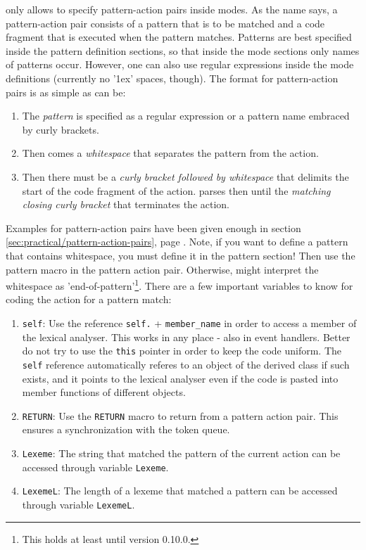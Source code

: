 {\Quex} only allows to specify pattern-action pairs inside modes. As the name
says, a pattern-action pair consists of a pattern that is to be matched and a
code fragment that is executed when the pattern matches. Patterns are best
specified inside the pattern definition sections, so that inside the mode sections
only names of patterns occur. However, one can also use regular expressions
inside the mode definitions (currently no '\kern 1ex' spaces, though). The format for pattern-action pairs is as simple
as can be: 

\begin{enumerate}
\item The {\it pattern} is specified as a regular expression or a pattern name
embraced by curly brackets.
\item Then comes a {\it whitespace} that separates the pattern from the action.
\item Then there must be a {\it curly bracket followed by whitespace} that
  delimits the start of the code fragment of the action. {\Quex} parses then
  until the {\it matching closing curly bracket} that terminates the action.
\end{enumerate}

Examples for pattern-action pairs have been given enough in section
\ref{sec:practical/pattern-action-pairs}, page
\pageref{sec:practical/pattern-action-pairs}. Note, if you want to define a
pattern that contains whitespace, you must define it in the pattern section!
Then use the pattern macro in the pattern action pair.  Otherwise, {\quex}
might interpret the whitespace as 'end-of-pattern'\footnote{This holds at least
  until version 0.10.0.}. There are a few important variables to know for
coding the action for a pattern match:

\begin{enumerate}
\item {\tt self}: Use the reference {\tt self.} + {\tt member\_name} in order to access a member of
  the lexical analyser. This works in any place - also in event handlers.
  Better do not try to use the {\tt this} pointer in order to keep the code
  uniform.  The {\tt self} reference automatically referes to an object of the
  derived class if such exists, and it points to the lexical analyser even if
  the code is pasted into member functions of different objects.
\item {\tt RETURN}: Use the {\tt RETURN} macro to return from a pattern action 
  pair. This ensures a synchronization with the token queue.
\item {\tt Lexeme}: The string that matched the pattern of the current action
  can be accessed through variable {\tt Lexeme}.
\item {\tt LexemeL}: The length of a lexeme  that matched a pattern can be accessed
  through variable {\tt LexemeL}.
\end{enumerate}





